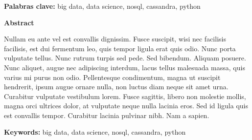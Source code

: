 \documentclass[14pt,a4paper,oneside,fleqn]{tmarticle}
\begin{document}
\vspace{0.5cm}
\textbf{Palabras clave: } big data, data science, nosql, cassandra, python

\clearpage
\textbf{Abstract}
\vspace{0.5cm}

Nullam eu ante vel est convallis dignissim.  Fusce suscipit, wisi nec facilisis facilisis, est dui fermentum leo, quis tempor ligula erat quis odio.  Nunc porta vulputate tellus.  Nunc rutrum turpis sed pede.  Sed bibendum.  Aliquam posuere.  Nunc aliquet, augue nec adipiscing interdum, lacus tellus malesuada massa, quis varius mi purus non odio.  Pellentesque condimentum, magna ut suscipit hendrerit, ipsum augue ornare nulla, non luctus diam neque sit amet urna.  Curabitur vulputate vestibulum lorem.  Fusce sagittis, libero non molestie mollis, magna orci ultrices dolor, at vulputate neque nulla lacinia eros.  Sed id ligula quis est convallis tempor.  Curabitur lacinia pulvinar nibh.  Nam a sapien.

\vspace{0.5cm}
\textbf{Keywords: } big data, data science, nosql, cassandra, python

\clearpage
\thispagestyle{empty}
\tableofcontents
\clearpage
\thispagestyle{empty}
\listoffigures
\clearpage
\setcounter{page}{1}


% 
% 
% 

% 

\nocite{*}
\clearpage
\glsaddall
\printglossary[nonumberlist]
\printbibliography[heading=bibintoc]
\end{document}

